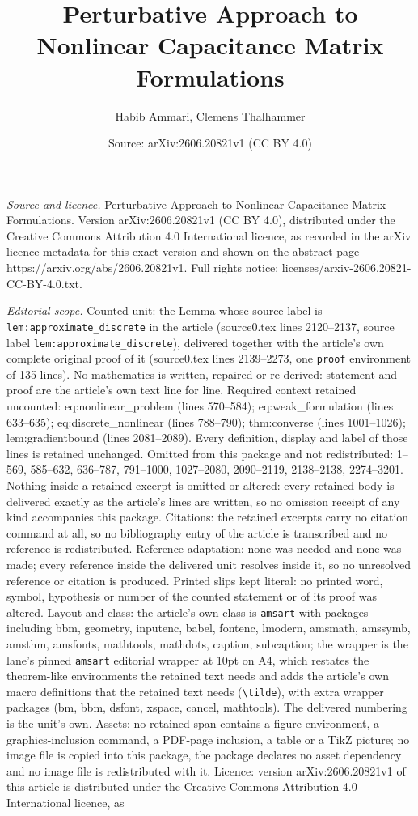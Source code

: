 \documentclass[10pt,a4paper]{amsart}
\title[Perturbative Approach to Nonlinear Capacitance Matrix Formul]{Perturbative Approach to Nonlinear Capacitance Matrix Formulations}
\author{Habib Ammari, Clemens Thalhammer}
\date{Source: arXiv:2606.20821v1 (CC BY 4.0)}
\begin{document}
\maketitle

\noindent\emph{Source and licence.} Perturbative Approach to Nonlinear Capacitance Matrix Formulations. Version arXiv:2606.20821v1 (CC BY 4.0), distributed under the Creative Commons Attribution 4.0 International licence, as recorded in the arXiv licence metadata for this exact version and shown on the abstract page https://arxiv.org/abs/2606.20821v1. Full rights notice: licenses/arxiv-2606.20821-CC-BY-4.0.txt.\par\smallskip

\noindent\textit{Editorial scope.} Counted unit: the Lemma whose source label is \texttt{lem:approximate\_discrete} in the article (source0.tex lines 2120--2137, source label \texttt{lem:approximate\_discrete}), delivered together with the article's own complete original proof of it (source0.tex lines 2139--2273, one \texttt{proof} environment of 135 lines). No mathematics is written, repaired or re-derived: statement and proof are the article's own text line for line. Required context retained uncounted: eq:nonlinear\_problem (lines 570--584); eq:weak\_formulation (lines 633--635); eq:discrete\_nonlinear (lines 788--790); thm:converse (lines 1001--1026); lem:gradientbound (lines 2081--2089). Every definition, display and label of those lines is retained unchanged. Omitted from this package and not redistributed: 1--569, 585--632, 636--787, 791--1000, 1027--2080, 2090--2119, 2138--2138, 2274--3201. Nothing inside a retained excerpt is omitted or altered: every retained body is delivered exactly as the article's lines are written, so no omission receipt of any kind accompanies this package. Citations: the retained excerpts carry no citation command at all, so no bibliography entry of the article is transcribed and no reference is redistributed. Reference adaptation: none was needed and none was made; every reference inside the delivered unit resolves inside it, so no unresolved reference or citation is produced. Printed slips kept literal: no printed word, symbol, hypothesis or number of the counted statement or of its proof was altered. Layout and class: the article's own class is \texttt{amsart} with packages including bbm, geometry, inputenc, babel, fontenc, lmodern, amsmath, amssymb, amsthm, amsfonts, mathtools, mathdots, caption, subcaption; the wrapper is the lane's pinned \texttt{amsart} editorial wrapper at 10pt on A4, which restates the theorem-like environments the retained text needs and adds the article's own macro definitions that the retained text needs (\texttt{\textbackslash tilde}), with extra wrapper packages (bm, bbm, dsfont, xspace, cancel, mathtools). The delivered numbering is the unit's own. Assets: no retained span contains a figure environment, a graphics-inclusion command, a PDF-page inclusion, a table or a TikZ picture; no image file is copied into this package, the package declares no asset dependency and no image file is redistributed with it. Licence: version arXiv:2606.20821v1 of this article is distributed under the Creative Commons Attribution 4.0 International licence, as 
\end{document}
